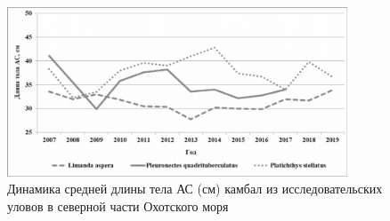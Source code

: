 \begin{figure}[h!]
  \begin{center}
    \includegraphics[width=0.9\textwidth]{authors/Byrlak-fig1.png}
  \end{center}
  \caption{Динамика средней длины тела АС (см) камбал из исследовательских уловов в северной части Охотского моря}
  \label{fig:byrlak-fig1}
\end{figure}
